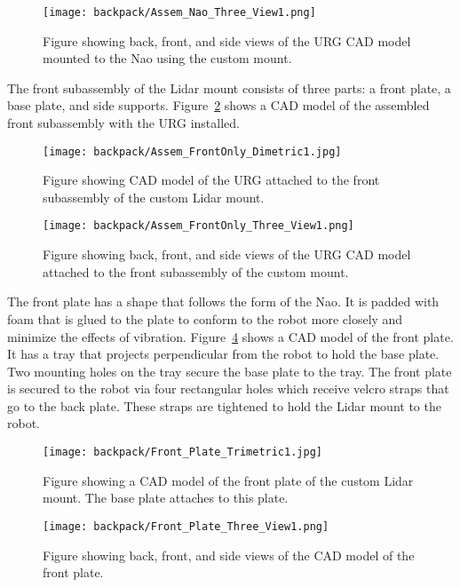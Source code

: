 \begin{figure}
\centering
\texttt{[image: backpack/Assem\_Nao\_Three\_View1.png]}
\caption{Figure showing back, front, and side views of the URG CAD model 
         mounted to the Nao using the custom mount.}
\label{fig:nao_lidar_mount_nao_three_view1}
\end{figure}

The front subassembly of the Lidar mount consists of three parts: a front plate,
a base plate, and side supports. Figure~\ref{fig:nao_lidar_mount_dimetric1}
shows a CAD model of the assembled front subassembly with the URG installed.

\begin{figure}
\centering
\texttt{[image: backpack/Assem\_FrontOnly\_Dimetric1.jpg]}
\caption{Figure showing CAD model of the URG attached to the front subassembly
         of the custom Lidar mount.}
\label{fig:nao_lidar_mount_dimetric1}
\end{figure}

\begin{figure}
\centering
\texttt{[image: backpack/Assem\_FrontOnly\_Three\_View1.png]}
\caption{Figure showing back, front, and side views of the URG CAD model
         attached to the front subassembly of the custom mount.}
\label{fig:nao_lidar_mount_three_view1}
\end{figure}

The front plate has a shape that follows the form of the Nao.
It is padded with foam that is glued to the plate to conform to the robot more
closely and minimize the effects of vibration.
Figure~\ref{fig:nao_lidar_mount_frontplate_trimetric1} shows a CAD model of the
front plate. It has a tray that projects perpendicular from the robot to hold 
the base plate. Two mounting holes on the tray secure the base plate to the tray.
The front plate is secured to the robot via four rectangular holes which receive
velcro straps that go to the back plate. These straps are tightened to hold the
Lidar mount to the robot.

\begin{figure}
\centering
\texttt{[image: backpack/Front\_Plate\_Trimetric1.jpg]}
\caption{Figure showing a CAD model of the front plate of the custom Lidar
         mount. The base plate attaches to this plate.}
\label{fig:nao_lidar_mount_frontplate_trimetric1}
\end{figure}

\begin{figure}
\centering
\texttt{[image: backpack/Front\_Plate\_Three\_View1.png]}
\caption{Figure showing back, front, and side views of the CAD model of the
         front plate.}
\label{fig:nao_lidar_mount_frontplate_three_view1}
\end{figure}

